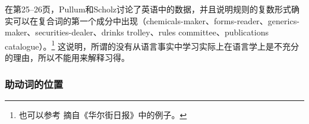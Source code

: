 在第25--26页，Pullum和Scholz讨论了英语中的数据，并且说明规则的复数形式确实可以在复合词的第一个成分中出现（chemicals-maker、forms-reader、generics-maker、securities-dealer、drinks trolley、rules committee、publications
  catalogue）。\footnote{%
也可以参考 摘自《华尔街日报》中的例子。
}
这说明，所谓的没有从语言事实中学习实际上在语言学上是不充分的理由，所以不能用来解释习得。

\subsubsection{助动词的位置}

